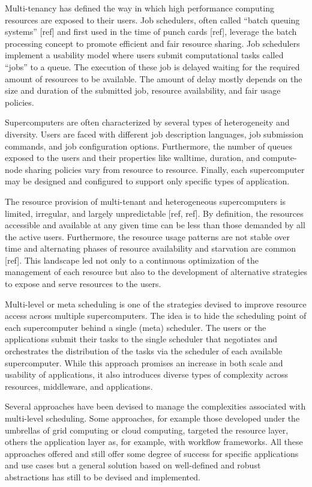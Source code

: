 \documentclass{sig-alternate}
\begin{document}
Multi-tenancy has defined the way in which high performance computing resources
are exposed to their users. Job schedulers, often called ``batch queuing
systems'' [ref] and first used in the time of punch cards [ref], leverage the
batch processing concept to promote efficient and fair resource sharing. Job
schedulers implement a usability model where users submit computational tasks
called ``jobs'' to a queue. The execution of these job is delayed waiting for
the required amount of resources to be available. The amount of delay mostly
depends on the size and duration of the submitted job, resource availability,
and fair usage policies.

Supercomputers are often characterized by several types of heterogeneity and
diversity. Users are faced with different job description languages, job
submission commands, and job configuration options. Furthermore,  the number of
queues exposed to the users and their properties like walltime, duration, and
compute-node sharing policies vary from resource to resource. Finally, each
supercomputer may be designed and configured to support only specific types of
application.

The resource provision of multi-tenant and heterogeneous supercomputers is
limited, irregular, and largely unpredictable [ref, ref]. By definition, the
resources accessible and available at any given time can be less than those
demanded by all the active users. Furthermore, the resource usage patterns are
not stable over time and alternating phases of resource availability and
starvation are common [ref]. This landscape led not only to a continuous
optimization of the management of each resource but also to the development of
alternative strategies to expose and serve resources to the users.

Multi-level or meta scheduling is one of the strategies devised to improve
resource access across multiple supercomputers. The idea is to hide the
scheduling point of each supercomputer behind a single (meta) scheduler. The
users or the applications submit their tasks to the single scheduler that
negotiates and orchestrates the distribution of the tasks via the scheduler of
each available supercomputer. While this approach promises an increase in both
scale and usability of applications, it also introduces diverse types of
complexity across resources, middleware, and applications.

Several approaches have been devised to manage the complexities associated with
multi-level scheduling. Some approaches, for example those developed under the
umbrellas of grid computing or cloud computing, targeted the resource layer,
others the application layer as, for example, with workflow frameworks. All
these approaches offered and still offer some degree of success for specific
applications and use cases but a general solution based on well-defined and
robust abstractions has still to be devised and implemented.
\end{document}
